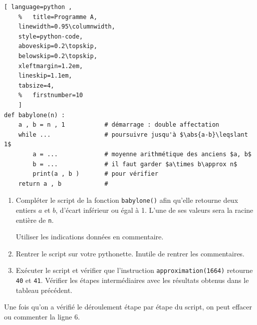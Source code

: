 \begin{lstlisting}[ language=python , 
	%	title=Programme A,   
	linewidth=0.95\columnwidth,
	style=python-code,    
	aboveskip=0.2\topskip,
	belowskip=0.2\topskip,
	xleftmargin=1.2em,
	lineskip=1.1em,
	tabsize=4,
	%	firstnumber=10  
	]
def babylone(n) : 
	a , b = n , 1			# démarrage : double affectation
	while ...				# poursuivre jusqu'à $\abs{a-b}\leqslant 1$ 
		a = ...				# moyenne arithmétique des anciens $a, b$ 
		b = ...				# il faut garder $a\times b\approx n$
		print(a , b )		# pour vérifier
	return a , b 			# 
\end{lstlisting} 
\begin{enumerate}[label=\alph*), leftmargin=*]
	\item Compléter le script de la fonction \lstinline|babylone()| afin qu'elle retourne deux entiers $a$ et $b$, d'écart inférieur ou égal à 1. L'une de ses valeurs sera la racine entière de \lstinline|n|. 
	
	Utiliser les indications données en commentaire.
	\item Rentrer le script sur votre pythonette. Inutile de rentrer les commentaires.
	
	\item Exécuter le script et vérifier que l'instruction \lstinline|approximation(1664)| retourne  \lstinline|40| et \lstinline|41|. Vérifier les étapes intermédiaires avec les résultats obtenus dans le tableau précédent. 
\end{enumerate}
\begin{tBox}
	Une fois qu'on a vérifié le déroulement étape par étape du script, on peut effacer ou commenter la ligne 6.
\end{tBox}
%	 
